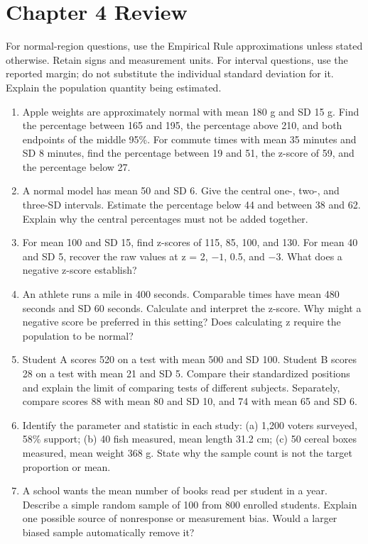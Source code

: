 \documentclass[11pt,letterpaper]{article}
\begin{document}
\section*{Chapter 4 Review}
For normal-region questions, use the Empirical Rule approximations unless stated otherwise. Retain signs and measurement units. For interval questions, use the reported margin; do not substitute the individual standard deviation for it. Explain the population quantity being estimated.
\begin{enumerate}
\item Apple weights are approximately normal with mean 180 g and SD 15 g. Find the percentage between 165 and 195, the percentage above 210, and both endpoints of the middle 95\%. For commute times with mean 35 minutes and SD 8 minutes, find the percentage between 19 and 51, the z-score of 59, and the percentage below 27.
\item A normal model has mean 50 and SD 6. Give the central one-, two-, and three-SD intervals. Estimate the percentage below 44 and between 38 and 62. Explain why the central percentages must not be added together.
\item For mean 100 and SD 15, find z-scores of 115, 85, 100, and 130. For mean 40 and SD 5, recover the raw values at z = 2, $-1$, 0.5, and $-3$. What does a negative z-score establish?
\item An athlete runs a mile in 400 seconds. Comparable times have mean 480 seconds and SD 60 seconds. Calculate and interpret the z-score. Why might a negative score be preferred in this setting? Does calculating z require the population to be normal?
\item Student A scores 520 on a test with mean 500 and SD 100. Student B scores 28 on a test with mean 21 and SD 5. Compare their standardized positions and explain the limit of comparing tests of different subjects. Separately, compare scores 88 with mean 80 and SD 10, and 74 with mean 65 and SD 6.
\item Identify the parameter and statistic in each study: (a) 1,200 voters surveyed, 58\% support; (b) 40 fish measured, mean length 31.2 cm; (c) 50 cereal boxes measured, mean weight 368 g. State why the sample count is not the target proportion or mean.
\item A school wants the mean number of books read per student in a year. Describe a simple random sample of 100 from 800 enrolled students. Explain one possible source of nonresponse or measurement bias. Would a larger biased sample automatically remove it?

\end{enumerate}
\end{document}
